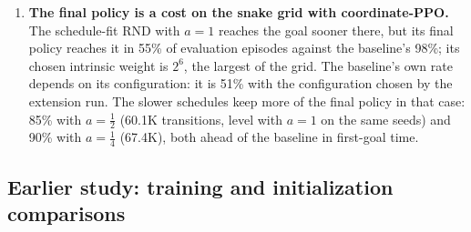 \begin{enumerate}[leftmargin=*]
\item \textbf{The final policy is a cost on the snake grid with coordinate-PPO.} The schedule-fit
RND with $a=1$ reaches the goal sooner there, but its final policy reaches it in 55\% of
evaluation episodes against the baseline's 98\%; its chosen intrinsic weight is $2^{6}$, the
largest of the grid. The baseline's own rate depends on its configuration: it is 51\% with the
configuration chosen by the extension run. The slower schedules keep more of the final policy in that case: 85\% with
$a=\tfrac12$ (60.1K transitions, level with $a=1$ on the same seeds) and 90\% with $a=\tfrac14$
(67.4K), both ahead of the baseline in first-goal time.
\end{enumerate}

\subsection{Earlier study: training and initialization comparisons}
